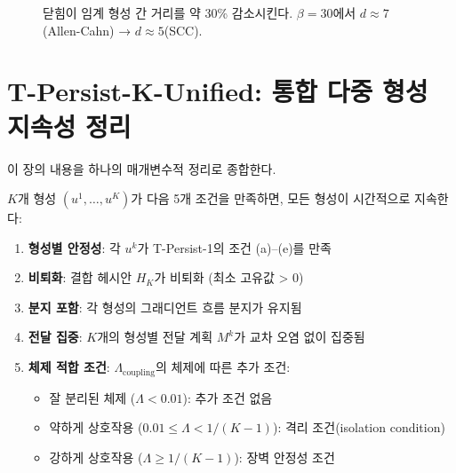 \begin{figure}[t]
\centering
{}
\caption{닫힘이 임계 형성 간 거리를 약 30\% 감소시킨다. $\beta = 30$에서 $d \approx 7$(Allen-Cahn) → $d \approx 5$(SCC).}
\label{fig:d-min-closure}
\end{figure}


\section{T-Persist-K-Unified: 통합 다중 형성 지속성 정리}
\label{sec:persist-k-unified}

이 장의 내용을 하나의 매개변수적 정리로 종합한다.

\begin{theorem}
\label{thm:persist-k-unified}
$K$개 형성 $(u^1, \ldots, u^K)$가 다음 5개 조건을 만족하면, 모든 형성이 시간적으로 지속한다:
\begin{enumerate}
    \item[\textbf{PS}] \textbf{형성별 안정성}: 각 $u^k$가 T-Persist-1의 조건 (a)--(e)를 만족
    \item[\textbf{ND}] \textbf{비퇴화}: 결합 헤시안 $H_K$가 비퇴화 (최소 고유값 > 0)
    \item[\textbf{BC'-K}] \textbf{분지 포함}: 각 형성의 그래디언트 흐름 분지가 유지됨
    \item[\textbf{TC-K}] \textbf{전달 집중}: $K$개의 형성별 전달 계획 $M^k$가 교차 오염 없이 집중됨
    \item[\textbf{SR-$\Lambda$}] \textbf{체제 적합 조건}: $\Lambda_{\mathrm{coupling}}$의 체제에 따른 추가 조건:
    \begin{itemize}
        \item 잘 분리된 체제 ($\Lambda < 0.01$): 추가 조건 없음
        \item 약하게 상호작용 ($0.01 \leq \Lambda < 1/(K-1)$): 격리 조건(isolation condition)
        \item 강하게 상호작용 ($\Lambda \geq 1/(K-1)$): 장벽 안정성 조건
    \end{itemize}
\end{enumerate}
\end{theorem}

